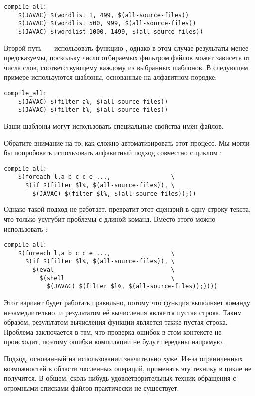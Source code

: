 {\footnotesize
\begin{verbatim}
compile_all:
    $(JAVAC) $(wordlist 1, 499, $(all-source-files))
    $(JAVAC) $(wordlist 500, 999, $(all-source-files))
    $(JAVAC) $(wordlist 1000, 1499, $(all-source-files))
\end{verbatim}
}

Второй путь~--- использовать функцию , однако в этом
случае результаты менее предсказуемы, поскольку число отбираемых
фильтром файлов может зависеть от числа слов, соответствующему
каждому из выбранных шаблонов. В следующем примере используются
шаблоны, основанные на алфавитном порядке:

{\footnotesize
\begin{verbatim}
compile_all:
    $(JAVAC) $(filter a%, $(all-source-files))
    $(JAVAC) $(filter b%, $(all-source-files))
\end{verbatim}
}

Ваши шаблоны могут использовать специальные свойства имён файлов.

Обратите внимание на то, как сложно автоматизировать этот процесс. Мы
могли бы попробовать использовать алфавитный подход совместно с циклом
:

{\footnotesize
\begin{verbatim}
compile_all:
    $(foreach l,a b c d e ...,                 \
      $(if $(filter $l%, $(all-source-files)), \
        $(JAVAC) $(filter $l%, $(all-source-files));))
\end{verbatim}
}

Однако такой подход не работает. \GNUmake{} превратит этот сценарий в
одну строку текста, что только усугубит проблемы с длиной команд.
Вместо этого можно использовать \function{eval}:

{\footnotesize
\begin{verbatim}
compile_all:
    $(foreach l,a b c d e ...,                 \
      $(if $(filter $l%, $(all-source-files)), \
        $(eval                                 \
          $(shell                              \
            $(JAVAC) $(filter $l%, $(all-source-files));))))
\end{verbatim}
}

Этот вариант будет работать правильно, потому что функция
\function{eval} выполняет команду  незамедлительно, и
результатом её вычисления является пустая строка. Таким образом,
результатом вычисления функции  является также
пустая строка. Проблема заключается в том, что проверка ошибок в этом
контексте не происходит, поэтому ошибки компиляции не будут переданы
\GNUmake{} напрямую.

Подход, основанный на использовании \function{wordlist} значительно
хуже. Из-за ограниченных возможностей \GNUmake{} в области численных
операций, применить эту технику в цикле не получится. В общем,
сколь-нибудь удовлетворительных техник обращения с огромными списками
файлов практически не существует.
